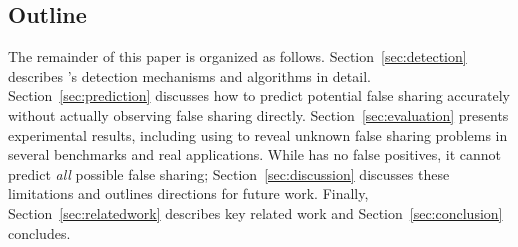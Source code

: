 \begin{itemize}

\end{itemize}

\subsection*{Outline}

The remainder of this paper is organized as follows. 
Section~\ref{sec:detection} describes \Predator{}'s detection mechanisms and
algorithms in detail.
Section~\ref{sec:prediction} discusses how to predict potential false sharing accurately 
without actually observing false sharing directly. 
Section~\ref{sec:evaluation} presents experimental results, including using \Predator{} to 
reveal unknown false sharing problems in several benchmarks and real applications. 
While \Predator{} has no false positives, it cannot predict \emph{all} possible false sharing; Section~\ref{sec:discussion} discusses these limitations and outlines directions for future work.
Finally, 
Section~\ref{sec:relatedwork} describes key related work and Section~\ref{sec:conclusion} concludes.


